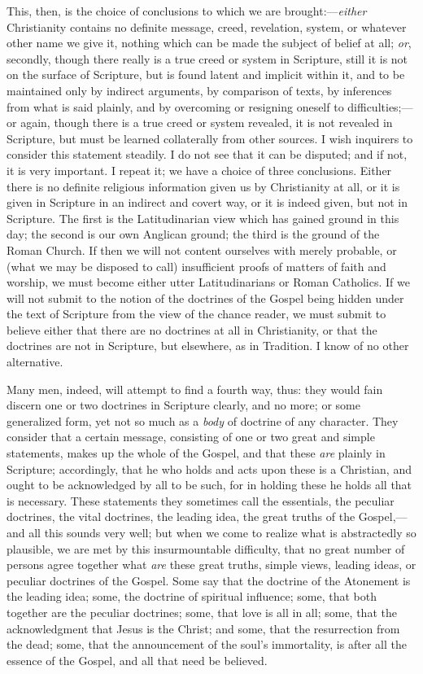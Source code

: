 This, then, is the choice of conclusions to which we are brought:—\emph{either}
Christianity contains no definite message, creed, revelation,
system, or whatever other name we give it, nothing which can be made
the subject of belief at all; \emph{or}, secondly, though there really
is a true creed or system in Scripture, still it is not on the surface
of Scripture, but is found latent and implicit within it, and to be
maintained only by indirect arguments, by comparison of texts, by
inferences from what is said plainly, and by overcoming or resigning
oneself to difficulties;—or again, though there is a true creed or
system revealed, it is not revealed in Scripture, but must be learned
collaterally from other sources. I wish inquirers to consider this
statement steadily. I do not see that it can be disputed; and if not,
it is very important. I repeat it; we have a choice of three
conclusions. Either there is no definite religious information given
us by Christianity at all, or it is given in Scripture in an indirect
and covert way, or it is indeed given, but not in Scripture. The first
is the Latitudinarian view which has gained ground in this day; the
second is our own Anglican ground; the third is the ground of the
Roman Church. If then we will not content ourselves with merely
probable, or (what we may be disposed to call) insufficient proofs of
matters of faith and worship, we must become either utter
Latitudinarians or Roman Catholics. If we will not submit to the
notion of the doctrines of the Gospel being hidden under the text of
Scripture from the view of the chance reader, we must submit to
believe either that there are no doctrines at all in Christianity, or
that the doctrines are not in Scripture, but elsewhere, as in
Tradition. I know of no other alternative.

Many men, indeed, will attempt to find a fourth way, thus: they
would fain discern one or two doctrines in Scripture clearly, and no
more; or some generalized form, yet not so much as a \emph{body}
of doctrine of any character. They consider that a certain message,
consisting of one or two great and simple statements, makes up the
whole of the Gospel, and that these \emph{are} plainly in Scripture;
accordingly, that he who holds and acts upon these is a Christian, and
ought to be acknowledged by all to be such, for in holding these he
holds all that is necessary. These statements they sometimes call the
essentials, the peculiar doctrines, the vital doctrines, the leading
idea, the great truths of the Gospel,—and all this sounds very well;
but when we come to realize what is abstractedly so plausible, we are
met by this insurmountable difficulty, that no great number of persons
agree together what \emph{are} these great truths, simple views, leading
ideas, or peculiar doctrines of the Gospel. Some say that the doctrine
of the Atonement is the leading idea; some, the doctrine of spiritual
influence; some, that both together are the peculiar doctrines; some,
that love is all in all; some, that the acknowledgment that Jesus is
the Christ; and some, that the resurrection from the dead; some, that
the announcement of the soul's immortality, is after all the essence
of the Gospel, and all that need be believed.

